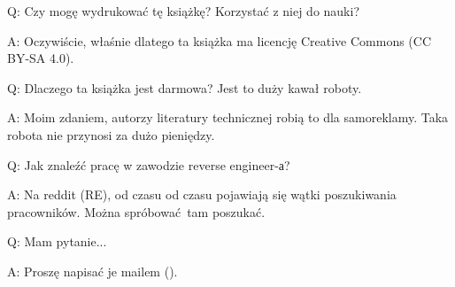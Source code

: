 \par Q: Czy mogę wydrukować tę książkę? Korzystać z niej do nauki?
\par A: Oczywiście, właśnie dlatego ta książka ma licencję Creative Commons (CC BY-SA 4.0).

\par Q: Dlaczego ta książka jest darmowa? Jest to duży kawał roboty.
\par A: Moim zdaniem, autorzy literatury technicznej robią to dla samoreklamy. Taka robota nie przynosi za dużo pieniędzy.

\par Q: Jak znaleźć pracę w zawodzie reverse engineer-а?
\par A: Na reddit (RE\FNURLREDDIT), od czasu od czasu pojawiają się wątki poszukiwania pracowników.
Można spróbować tam poszukać.


\par Q: Mam pytanie...
\par A: Proszę napisać je mailem (\EMAIL).


